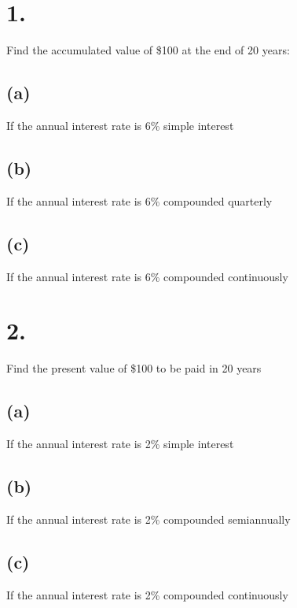 \documentclass{article}
\begin{document}
\thispagestyle{firstpageheader}

\section*{1.}
{\Large 

Find the accumulated value of \$100 at the end of 20 years:

\subsection*{(a)}

If the annual interest rate is 6\% simple interest \\

\subsection*{(b)}

If the annual interest rate is 6\% compounded quarterly \\

\subsection*{(c)}

If the annual interest rate is 6\% compounded continuously \\

}

\section*{2.}
{\Large

Find the present value of \$100 to be paid in 20 years

\subsection*{(a)}

If the annual interest rate is 2\% simple interest \\

\subsection*{(b)}

If the annual interest rate is 2\% compounded semiannually \\

\subsection*{(c)}

If the annual interest rate is 2\% compounded continuously \\

}
\end{document}
